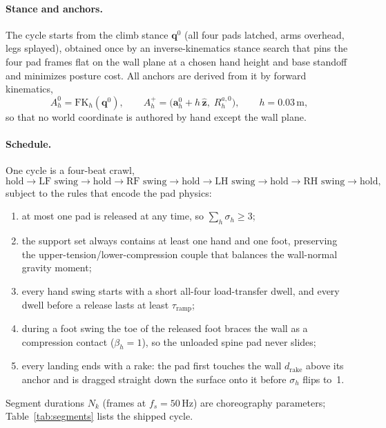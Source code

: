 \documentclass[11pt]{article}
\newcommand{\zhat}{\hat{\bm z}}
\begin{document}
\paragraph{Stance and anchors.} The cycle starts from the climb stance
$\bm q^0$ (all four pads latched, arms overhead, legs splayed), obtained
once by an inverse-kinematics stance search that pins the four pad frames
flat on the wall plane at a chosen hand height and base standoff and
minimizes posture cost. All anchors are derived from it by forward
kinematics,
\begin{equation}
  A^0_h=\mathrm{FK}_h(\bm q^0),\qquad
  A^+_h=\bigl(\bm a^0_h+h\,\zhat,\;R^{a,0}_h\bigr),\qquad h=0.03\,\mathrm m,
\end{equation}
so that no world coordinate is authored by hand except the wall plane.

\paragraph{Schedule.} One cycle is a four-beat crawl,
\[
\text{hold}\to\text{LF swing}\to\text{hold}\to\text{RF swing}\to\text{hold}
\to\text{LH swing}\to\text{hold}\to\text{RH swing}\to\text{hold},
\]
subject to the rules that encode the pad physics:
\begin{enumerate}[label=(S\arabic*),leftmargin=2.6em]
  \item at most one pad is released at any time, so $\sum_h\sigma_h\ge3$;
  \item the support set always contains at least one hand and one foot,
        preserving the upper-tension/lower-compression couple that balances
        the wall-normal gravity moment;
  \item every hand swing starts with a short all-four load-transfer dwell,
        and every dwell before a release lasts at least $\tau_{\mathrm{ramp}}$;
  \item during a foot swing the toe of the released foot braces the wall as a
        compression contact ($\beta_h=1$), so the unloaded spine pad never
        slides;
  \item every landing ends with a rake: the pad first touches the wall
        $d_{\mathrm{rake}}$ above its anchor and is dragged straight down the
        surface onto it before $\sigma_h$ flips to~1.
\end{enumerate}
Segment durations $N_k$ (frames at $f_s=50$\,Hz) are choreography parameters;
Table~\ref{tab:segments} lists the shipped cycle.
\end{document}
